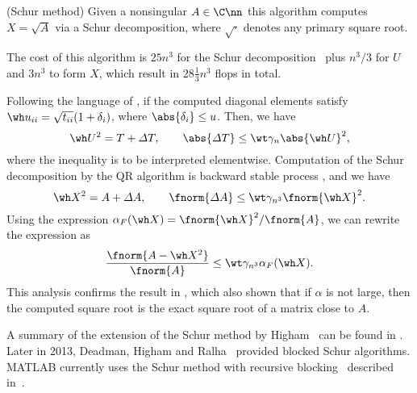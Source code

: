 \begin{algorithm}[H]
\caption{(Schur method) Given a nonsingular $A\in\C\nn$ this algorithm
  computes $X = \sqrt{A}$ via a Schur decomposition, where $\sqrt{\cdot}$
  denotes any primary square root.}
\label{alg.schur}
\begin{algorithmic}[1]
\EndFor
\EndFor
{}
\end{algorithmic}
\end{algorithm}
The cost of this algorithm is $25n^{3}$ for the Schur
decomposition~ plus $n^{3}/3$ for $U$
and $3n^{3}$ to form $X$, which result in $28 \frac{1}{3}n^{3}$ flops in
total.

Following the language of , if the
computed diagonal elements satisfy
$\wh u_{ii} = \sqrt{t_{ii}}(1 + \delta_{i})$, where
$\abs{\delta_{i}} \le u$. Then, we have
\begin{equation}\notag
  \wh U^{2} = T + \varDelta T, \qquad \abs{\varDelta T} \le
  \wt \gamma_{n}\abs{\wh U}^{2},
\end{equation}
where the inequality is to be interpreted elementwise. Computation of the
Schur decomposition by the QR algorithm is backward stable process
, and we have
\begin{equation}\notag
  \wh X^{2} = A + \varDelta A, \qquad \fnorm{\varDelta A} \le \wt
  \gamma_{n^{3}} \fnorm{\wh X}^{2}.
\end{equation}
Using the expression $\alpha_{F}(\wh X) = \fnorm{\wh X}^{2}/\fnorm{A}$, we
can rewrite the expression as
\begin{equation}\notag
  \frac{\fnorm{A - \wh X^{2}}}{\fnorm{A}} \le \wt
  \gamma_{n^{3}}\alpha_{F}(\wh X).
\end{equation}
This analysis confirms the result in , which also shown
that if $\alpha$ is not large, then the computed square root is the exact
square root of a matrix close to $A$.

A summary of the extension of the Schur method by
Higham~ can be found in
. Later in 2013, Deadman, Higham and
Ralha~ provided blocked Schur algorithms. MATLAB
currently uses the Schur method with recursive blocking~ described in~. 

